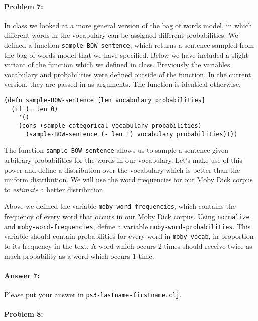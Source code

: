 \documentclass[10pt]{article}
\newcommand{\PSnum}{3}
\begin{document}
\noindent\hrulefill %

\paragraph{Problem 7:}

In class we looked at a more general version of the bag of words
model, in which different words in the vocabulary can be assigned
different probabilities. We defined a function \texttt{sample-BOW-sentence},
which returns a sentence sampled from the bag of words model that we
have specified. Below we have included a slight variant of the
function which we defined in class. Previously the variables
vocabulary and probabilities were defined outside of the function. In
the current version, they are passed in as arguments. The function is
identical otherwise.

\begin{lstlisting}
(defn sample-BOW-sentence [len vocabulary probabilities]
  (if (= len 0)
    '()
    (cons (sample-categorical vocabulary probabilities)
	  (sample-BOW-sentence (- len 1) vocabulary probabilities))))
\end{lstlisting}

The function \texttt{sample-BOW-sentence} allows us to sample a
sentence given arbitrary probabilities for the words in our
vocabulary. Let's make use of this power and define a distribution
over the vocabulary which is better than the uniform distribution. We
will use the word frequencies for our Moby Dick corpus to
\emph{estimate} a better distribution.
  
Above we defined the variable \texttt{moby-word-frequencies}, which
contains the frequency of every word that occurs in our Moby Dick
corpus. Using \texttt{normalize} and \texttt{moby-word-frequencies},
define a variable \texttt{moby-word-probabilities}. This variable
should contain probabilities for every word in \texttt{moby-vocab}, in
proportion to its frequency in the text. A word which occurs 2 times
should receive twice as much probability as a word which occurs 1
time.

\paragraph{Answer 7:} Please put your answer in
\texttt{ps\PSnum-lastname-firstname.clj}.

\noindent\hrulefill %

\paragraph{Problem 8:}
\end{document}

